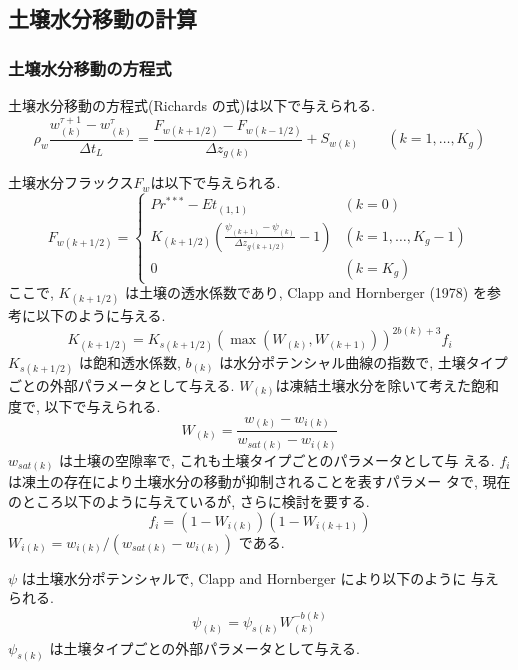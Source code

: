 \subsection{土壌水分移動の計算}

\subsubsection{土壌水分移動の方程式}

土壌水分移動の方程式(Richards の式)は以下で与えられる.
\begin{equation}
\rho_w \frac{w_{(k)}^{\tau+1} - w_{(k)}^{\tau}}{\Delta t_L} =
\frac{F_{w(k+1/2)} - F_{w(k-1/2)}}{\Delta z_{g(k)}} + S_{w(k)}
\qquad (k=1,\ldots,K_{g})
\label{wat_diff}
\end{equation}

土壌水分フラックス$F_{w}$は以下で与えられる.
\begin{equation}
 F_{w(k+1/2)} =
\left\{
\begin{array}{ll}
Pr^{***} - Et_{(1,1)}
& (k=0)\\
\displaystyle{
K_{(k+1/2)} \left(\frac{\psi_{(k+1)} - \psi_{(k)}}{\Delta z_{g(k+1/2)}} - 1 \right)
}
& (k=1,\ldots,K_{g}-1) \\
\displaystyle{
0
}
& (k=K_{g})
\end{array}
\right.
\label{wat_dflux}
\end{equation}
ここで, $K_{(k+1/2)}$ は土壌の透水係数であり, Clapp and Hornberger
(1978) を参考に以下のように与える.
\begin{equation}
 K_{(k+1/2)} = K_{s(k+1/2)} (\max(W_{(k)},W_{(k+1)}))^{2b(k)+3} f_i
\end{equation}
$K_{s(k+1/2)}$ は飽和透水係数, $b_{(k)}$ は水分ポテンシャル曲線の指数で,
土壌タイプごとの外部パラメータとして与える.
$W_{(k)}$は凍結土壌水分を除いて考えた飽和度で, 以下で与えられる.
\begin{equation}
 W_{(k)} = \frac{w_{(k)}-w_{i(k)}}{w_{sat(k)}-w_{i(k)}}
\end{equation}
$w_{sat(k)}$ は土壌の空隙率で, これも土壌タイプごとのパラメータとして与
える. $f_i$ は凍土の存在により土壌水分の移動が抑制されることを表すパラメー
タで, 現在のところ以下のように与えているが, さらに検討を要する.
\begin{equation}
 f_i = \left(1- W_{i(k)}\right)
       \left(1- W_{i(k+1)}\right)
\end{equation}
$W_{i(k)} = w_{i(k)}/(w_{sat(k)}-w_{i(k)})$ である.

$\psi$ は土壌水分ポテンシャルで, Clapp and Hornberger により以下のように
与えられる.
\begin{eqnarray}
 \psi_{(k)} = \psi_{s(k)} W_{(k)}^{-b(k)}
\end{eqnarray}
$\psi_{s(k)}$ は土壌タイプごとの外部パラメータとして与える.

